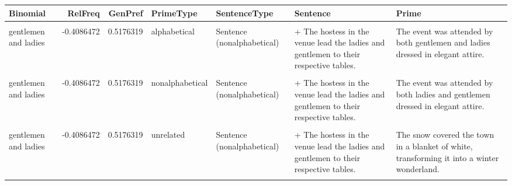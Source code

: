 \documentclass[
  12pt,
]{scrartcl}
\begin{document}
\begin{landscape}
\begin{longtable}{lrrllll}
\toprule
\textbf{Binomial} & \textbf{RelFreq} & \textbf{GenPref} & \textbf{PrimeType} & \textbf{SentenceType} & \textbf{Sentence} & \textbf{Prime}\\
\midrule
\cellcolor{gray!6}{gentlemen and ladies} & \cellcolor{gray!6}{-0.4086472} & \cellcolor{gray!6}{0.5176319} & \cellcolor{gray!6}{alphabetical} & \cellcolor{gray!6}{Sentence (alphabetical)} & \cellcolor{gray!6}{+ The hostess in the venue lead the gentlemen and ladies to their respective tables.} & \cellcolor{gray!6}{The event was attended by both gentlemen and ladies dressed in elegant attire.}\\
gentlemen and ladies & -0.4086472 & 0.5176319 & alphabetical & Sentence (nonalphabetical) & + The hostess in the venue lead the ladies and gentlemen to their respective tables. & The event was attended by both gentlemen and ladies dressed in elegant attire.\\
\cellcolor{gray!6}{gentlemen and ladies} & \cellcolor{gray!6}{-0.4086472} & \cellcolor{gray!6}{0.5176319} & \cellcolor{gray!6}{nonalphabetical} & \cellcolor{gray!6}{Sentence (alphabetical)} & \cellcolor{gray!6}{+ The hostess in the venue lead the gentlemen and ladies to their respective tables.} & \cellcolor{gray!6}{The event was attended by both ladies and gentlemen dressed in elegant attire.}\\
gentlemen and ladies & -0.4086472 & 0.5176319 & nonalphabetical & Sentence (nonalphabetical) & + The hostess in the venue lead the ladies and gentlemen to their respective tables. & The event was attended by both ladies and gentlemen dressed in elegant attire.\\
\cellcolor{gray!6}{gentlemen and ladies} & \cellcolor{gray!6}{-0.4086472} & \cellcolor{gray!6}{0.5176319} & \cellcolor{gray!6}{unrelated} & \cellcolor{gray!6}{Sentence (alphabetical)} & \cellcolor{gray!6}{+ The hostess in the venue lead the gentlemen and ladies to their respective tables.} & \cellcolor{gray!6}{The snow covered the town in a blanket of white, transforming it into a winter wonderland.}\\
\addlinespace
gentlemen and ladies & -0.4086472 & 0.5176319 & unrelated & Sentence (nonalphabetical) & + The hostess in the venue lead the ladies and gentlemen to their respective tables. & The snow covered the town in a blanket of white, transforming it into a winter wonderland.\\
\cellcolor{gray!6}{fruits and vegetables} & \cellcolor{gray!6}{0.3501051} & \cellcolor{gray!6}{0.6085325} & \cellcolor{gray!6}{alphabetical} & \cellcolor{gray!6}{Sentence (alphabetical)} & \cellcolor{gray!6}{+ Growing up, Paul ate his fruits and vegetables everyday at each meal.} & \cellcolor{gray!6}{A healthy diet includes a balance of fruits and vegetables for essential nutrients.}\\

\end{longtable}
\end{landscape}
\end{document}
